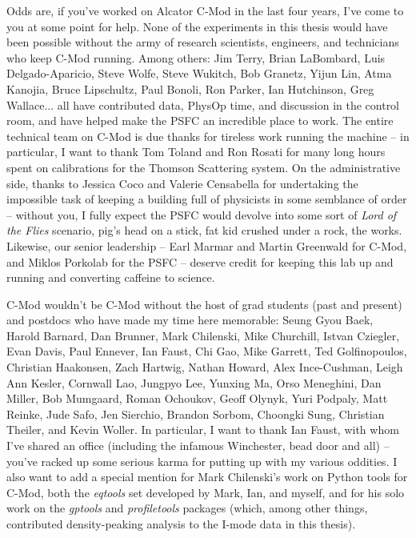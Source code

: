 Odds are, if you've worked on Alcator C-Mod in the last four years, I've come to you at some point for help.  None of the experiments in this thesis would have been possible without the army of research scientists, engineers, and technicians who keep C-Mod running.  Among others: Jim Terry, Brian LaBombard, Luis Delgado-Aparicio, Steve Wolfe, Steve Wukitch, Bob Granetz, Yijun Lin, Atma Kanojia, Bruce Lipschultz, Paul Bonoli, Ron Parker, Ian Hutchinson, Greg Wallace... all have contributed data, PhysOp time, and discussion in the control room, and have helped make the PSFC an incredible place to work.  The entire technical team on C-Mod is due thanks for tireless work running the machine -- in particular, I want to thank Tom Toland and Ron Rosati for many long hours spent on calibrations for the Thomson Scattering system.  On the administrative side, thanks to Jessica Coco and Valerie Censabella for undertaking the impossible task of keeping a building full of physicists in some semblance of order -- without you, I fully expect the PSFC would devolve into some sort of \emph{Lord of the Flies} scenario, pig's head on a stick, fat kid crushed under a rock, the works.  Likewise, our senior leadership -- Earl Marmar and Martin Greenwald for C-Mod, and Miklos Porkolab for the PSFC -- deserve credit for keeping this lab up and running and converting caffeine to science.

C-Mod wouldn't be C-Mod without the host of grad students (past and present) and postdocs who have made my time here memorable: Seung Gyou Baek, Harold Barnard, Dan Brunner, Mark Chilenski, Mike Churchill, Istvan Cziegler, Evan Davis, Paul Ennever, Ian Faust, Chi Gao, Mike Garrett, Ted Golfinopoulos, Christian Haakonsen, Zach Hartwig, Nathan Howard, Alex Ince-Cushman, Leigh Ann Kesler, Cornwall Lao, Jungpyo Lee, Yunxing Ma, Orso Meneghini, Dan Miller, Bob Mumgaard, Roman Ochoukov, Geoff Olynyk, Yuri Podpaly, Matt Reinke, Jude Safo, Jen Sierchio, Brandon Sorbom, Choongki Sung, Christian Theiler, and Kevin Woller.  In particular, I want to thank Ian Faust, with whom I've shared an office (including the infamous Winchester, bead door and all) -- you've racked up some serious karma for putting up with my various oddities.  I also want to add a special mention for Mark Chilenski's work on Python tools for C-Mod, both the \emph{eqtools} set developed by Mark, Ian, and myself, and for his solo work on the \emph{gptools} and \emph{profiletools} packages (which, among other things, contributed density-peaking analysis to the I-mode data in this thesis).

